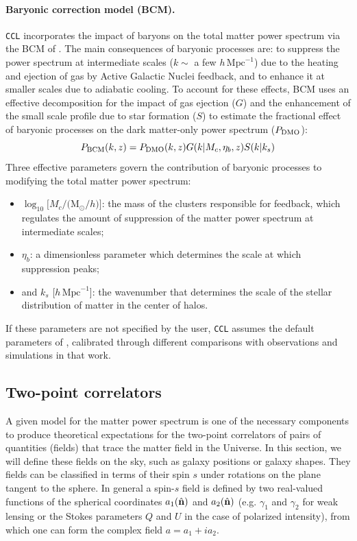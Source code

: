\documentclass[\docopts]{\docclass}
\newcommand{\nv}{\hat{\bf n}}
\newcommand{\ccl}{{\tt CCL}\xspace}
\begin{document}
\paragraph{\bf Baryonic correction model (BCM).} \ccl incorporates the impact of baryons on the total matter power spectrum via the BCM of \citet{Schneider15}. The main consequences of baryonic processes are: to suppress the power spectrum at intermediate scales ($k\sim$ a few $h\,\text{Mpc}^{-1}$) due to the heating and ejection of gas by Active Galactic Nuclei feedback, and to enhance it at smaller scales due to adiabatic cooling. To account for these effects, BCM uses an effective decomposition for the impact of gas ejection ($G$) and the enhancement of the small scale profile due to star formation ($S$) to estimate the fractional effect of baryonic processes on the dark matter-only power spectrum ($P_{\rm DMO}$):
\begin{equation}
  P_{\rm BCM}(k,z)=P_{\rm DMO}(k,z) G(k|M_c,\eta_b,z)S(k|k_s)
\end{equation}
Three effective parameters govern the contribution of baryonic processes to modifying the total matter power spectrum:
 \begin{itemize}
   \item $\log_{10} [M_c/($M$_\odot/h)]$: the mass of the clusters responsible for feedback, which regulates the amount of suppression of the matter power spectrum at intermediate scales;
   \item $\eta_b$: a dimensionless parameter which determines the scale at which suppression peaks;
   \item and $k_s$ [$h\,\text{Mpc}^{-1}$]: the wavenumber that determines the scale of the stellar distribution of matter in the center of halos.
 \end{itemize}
 If these parameters are not specified by the user, \ccl assumes the default parameters of \citet{Schneider15}, calibrated through different comparisons with observations and simulations in that work.

\subsection{Two-point correlators}\label{ss:2point}

A given model for the matter power spectrum is one of the necessary components to produce theoretical expectations for the two-point correlators of pairs of quantities (fields) that trace the matter field in the Universe. In this section, we will define these fields on the sky, such as galaxy positions or galaxy shapes. They fields can be classified in terms of their spin $s$ under rotations on the plane tangent to the sphere. In general a spin-$s$ field is defined by two real-valued functions of the spherical coordinates $a_1(\nv)$ and $a_2(\nv)$ (e.g. $\gamma_1$ and $\gamma_2$ for weak lensing or the Stokes parameters $Q$ and $U$ in the case of polarized intensity), from which one can form the complex field $a=a_1+ia_2$.
\end{document}

